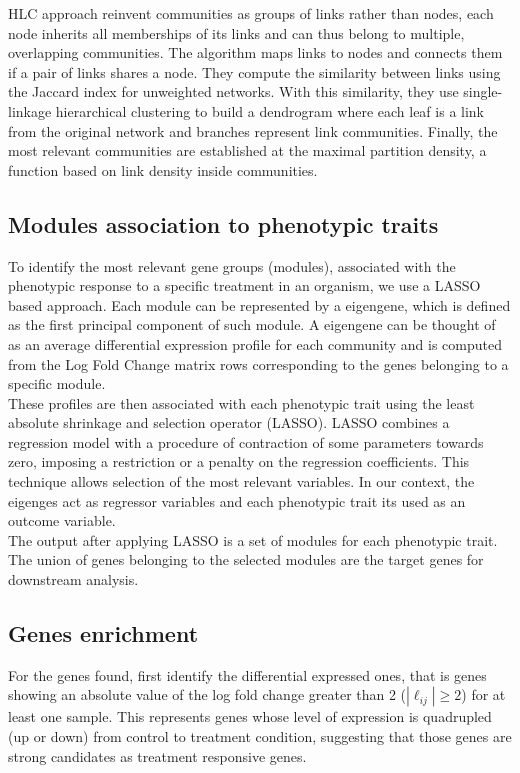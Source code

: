 \documentclass[12pt,journal, onecolumn]{IEEEtran}
\begin{document}
HLC approach reinvent communities as groups of links rather than nodes, each node inherits all memberships of its links and can thus belong to multiple, overlapping communities. The algorithm maps links to nodes and connects them if a pair of links shares a node. They compute the similarity between links using the Jaccard index for unweighted networks. With this similarity, they use single-linkage hierarchical clustering to build a dendrogram where each leaf is a link from the original network and branches represent link communities. Finally, the most relevant communities are established at the maximal partition density, a function  based on link density inside communities.

\subsection{Modules association to phenotypic traits}

To identify the most relevant gene groups (modules), associated with the phenotypic response to a specific treatment in an organism, we use a LASSO based approach. Each module can be represented by a eigengene, which is defined as the first principal component of such module. A eigengene can be thought of as an average differential expression profile for each community and is computed from the Log Fold Change matrix rows corresponding to the genes belonging to a specific module. \\

These profiles are then associated with each phenotypic trait using the least absolute shrinkage and selection operator (LASSO). LASSO combines a regression model with a procedure of contraction of some parameters towards zero, imposing a restriction or a penalty on the regression coefficients. This technique allows selection of the most relevant variables. In our context, the eigenges act as regressor variables and each phenotypic trait its used as an outcome variable. \\

The output after applying LASSO is a set of modules for each phenotypic trait. The union of genes belonging to the selected modules are the target genes for downstream analysis.

\subsection{Genes enrichment}

For the genes found, first identify the differential expressed ones, that is genes showing an absolute value of the log fold change greater than 2 ($|\ell_{ij}|\geq 2$) for at least one sample. This represents genes whose level of expression is quadrupled (up or down) from control to treatment condition, suggesting that those genes are strong candidates as treatment responsive genes.\\
\end{document}
